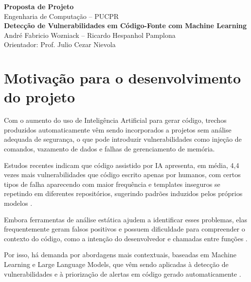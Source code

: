\documentclass[12pt,a4paper]{article}
\begin{document}
\begin{center}

{\Large \textbf{Proposta de Projeto}}\\[0.3cm]

Engenharia de Computação -- PUCPR\\[0.15cm]

\textbf{Detecção de Vulnerabilidades em Código-Fonte com Machine Learning}\\[0.15cm]

André Fabricio Wozniack -- Ricardo Hespanhol Pamplona\\[0.15cm]

Orientador: Prof. Julio Cezar Nievola

\end{center}

\vspace{0.3cm}

\section{Motivação para o desenvolvimento do projeto}

Com o aumento do uso de Inteligência Artificial para gerar código,
trechos produzidos automaticamente vêm sendo incorporados a projetos
sem análise adequada de segurança, o que pode introduzir
vulnerabilidades como injeção de comandos, vazamento de dados e falhas
de gerenciamento de memória.

Estudos recentes indicam que código assistido por IA apresenta, em
média, 4,4 vezes mais vulnerabilidades que código escrito apenas por
humanos, com certos tipos de falha aparecendo com maior frequência e
templates inseguros se repetindo em diferentes repositórios, sugerindo
padrões induzidos pelos próprios modelos
\parencite{stateofcyber2026,wu2025}.

Embora ferramentas de análise estática ajudem a identificar esses
problemas, elas frequentemente geram falsos positivos e possuem
dificuldade para compreender o contexto do código, como a intenção do
desenvolvedor e chamadas entre funções
\parencite{yang2025,techscience2025}.

Por isso, há demanda por abordagens mais contextuais, baseadas em
Machine Learning e Large Language Models, que vêm sendo aplicadas à
detecção de vulnerabilidades e à priorização de alertas em código
gerado automaticamente
\parencite{wang2025,mdpi2026}.

\end{document}
